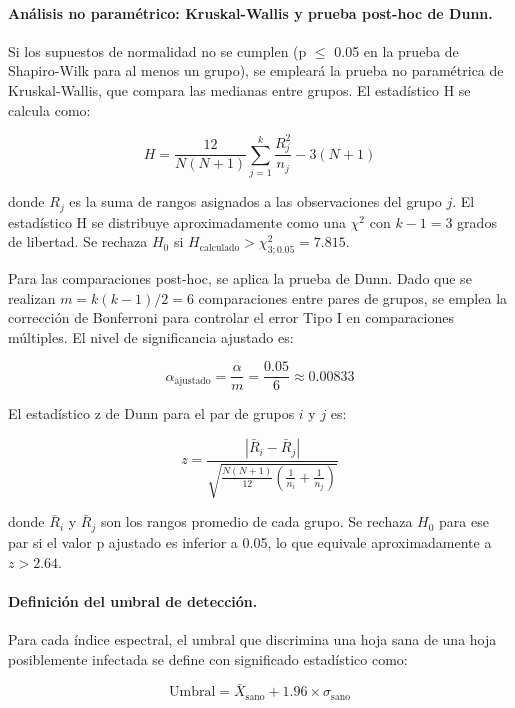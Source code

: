 \documentclass[12pt, a4paper]{article}
\begin{document}
	\paragraph{Análisis no paramétrico: Kruskal-Wallis y prueba post-hoc de Dunn.}
	Si los supuestos de normalidad no se cumplen (p $\leq$ 0.05 en la prueba de Shapiro-Wilk para al menos un grupo), se empleará la prueba no paramétrica de Kruskal-Wallis, que compara las medianas entre grupos. El estadístico H se calcula como:
	
	\begin{equation}
		H = \frac{12}{N(N+1)} \sum_{j=1}^{k} \frac{R_j^2}{n_j} - 3(N+1)
	\end{equation}
	
	donde $R_j$ es la suma de rangos asignados a las observaciones del grupo $j$. El estadístico H se distribuye aproximadamente como una $\chi^2$ con $k-1 = 3$ grados de libertad. Se rechaza $H_0$ si $H_{\text{calculado}} > \chi^2_{3;0.05} = 7.815$.
	
	Para las comparaciones post-hoc, se aplica la prueba de Dunn. Dado que se realizan $m = k(k-1)/2 = 6$ comparaciones entre pares de grupos, se emplea la corrección de Bonferroni para controlar el error Tipo I en comparaciones múltiples. El nivel de significancia ajustado es:
	
	\begin{equation}
		\alpha_{\text{ajustado}} = \frac{\alpha}{m} = \frac{0.05}{6} \approx 0.00833
	\end{equation}
	
	El estadístico z de Dunn para el par de grupos $i$ y $j$ es:
	
	\begin{equation}
		z = \frac{|\bar{R}_i - \bar{R}_j|}{\sqrt{\frac{N(N+1)}{12} \left( \frac{1}{n_i} + \frac{1}{n_j} \right)}}
	\end{equation}
	
	donde $\bar{R}_i$ y $\bar{R}_j$ son los rangos promedio de cada grupo. Se rechaza $H_0$ para ese par si el valor p ajustado es inferior a 0.05, lo que equivale aproximadamente a $z > 2.64$.
	
	\paragraph{Definición del umbral de detección.}
	Para cada índice espectral, el umbral que discrimina una hoja sana de una hoja posiblemente infectada se define con significado estadístico como:
	
	\begin{equation}
		\text{Umbral} = \bar{X}_{\text{sano}} + 1.96 \times \sigma_{\text{sano}}
	\end{equation}
	
\end{document}
